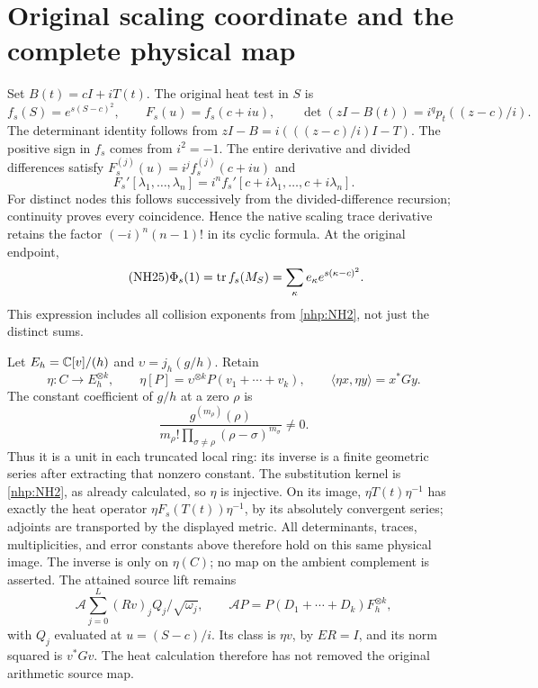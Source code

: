 \section{Original scaling coordinate and the complete physical map}

Set \(B(t)=cI+iT(t)\). The original heat test in \(S\) is
\begin{equation}\tag{NH24}\label{nhp:NH24}
f_s(S)=e^{s(S-c)^2},\qquad
F_s(u)=f_s(c+iu),\qquad
\det(zI-B(t))=i^q p_t((z-c)/i).
\end{equation}
The determinant identity follows from
\(zI-B=i(((z-c)/i)I-T)\).
The positive sign in \(f_s\) comes from \(i^2=-1\).
The entire derivative and divided differences satisfy
\(F_s^{(j)}(u)=i^j f_s^{(j)}(c+iu)\) and
\[
F_s'[\lambda_1,\ldots,\lambda_n]
=i^n f_s'[c+i\lambda_1,\ldots,c+i\lambda_n].
\]
For distinct nodes this follows successively from the
divided-difference recursion; continuity proves every
coincidence. Hence the native scaling trace derivative
retains the factor \((-i)^n(n-1)!\) in its cyclic formula.
At the original endpoint,
\begin{equation}\tag{NH25}\label{nhp:NH25}
\Phi_s(1)=\operatorname{tr} f_s(M_S)
=\sum_\kappa e_\kappa e^{s(\kappa-c)^2}.
\end{equation}
This expression includes all collision exponents from
\eqref{nhp:NH2}, not just the distinct sums.

Let \(E_h=\mathbb C[v]/(h)\) and
\(\upsilon=j_h(g/h)\). Retain
\begin{equation}\tag{NH26}\label{nhp:NH26}
\eta:C\longrightarrow E_h^{\otimes k},\qquad
\eta[P]=\upsilon^{\otimes k}P(v_1+\cdots+v_k),\qquad
\langle\eta x,\eta y\rangle=x^*Gy.
\end{equation}
The constant coefficient of \(g/h\) at a zero \(\rho\) is
\[
\frac{g^{(m_\rho)}(\rho)}
 {m_\rho!\prod_{\sigma\ne\rho}(\rho-\sigma)^{m_\sigma}}\ne0 .
\]
Thus it is a unit in each truncated local ring: its
inverse is a finite geometric series after extracting
that nonzero constant. The substitution kernel is
\eqref{nhp:NH2}, as already calculated, so \(\eta\) is injective.
On its image, \(\eta T(t)\eta^{-1}\) has exactly the
heat operator \(\eta F_s(T(t))\eta^{-1}\), by its
absolutely convergent series; adjoints are transported
by the displayed metric. All determinants, traces,
multiplicities, and error constants above therefore
hold on this same physical image. The inverse is only
on \(\eta(C)\); no map on the ambient complement is asserted.
The attained source lift remains
\[
\mathcal A\sum_{j=0}^L(Rv)_jQ_j/\sqrt{\omega_j},
\qquad
\mathcal A P=P(D_1+\cdots+D_k)F_h^{\otimes k},
\]
with \(Q_j\) evaluated at \(u=(S-c)/i\).
Its class is \(\eta v\), by \(ER=I\), and its norm
squared is \(v^*Gv\). The heat calculation therefore
has not removed the original arithmetic source map.

